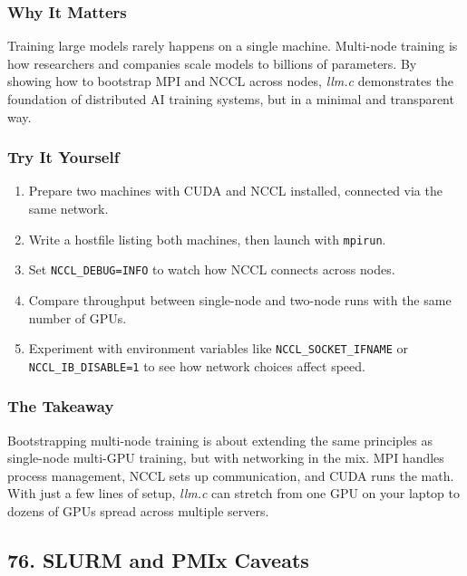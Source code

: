 \documentclass[
  letterpaper,
  DIV=11,
  numbers=noendperiod]{scrreprt}
\providecommand{\tightlist}{%
  \setlength{\itemsep}{0pt}\setlength{\parskip}{0pt}}
\begin{document}
\subsubsection{Why It Matters}\label{why-it-matters-49}

Training large models rarely happens on a single machine. Multi-node
training is how researchers and companies scale models to billions of
parameters. By showing how to bootstrap MPI and NCCL across nodes,
\emph{llm.c} demonstrates the foundation of distributed AI training
systems, but in a minimal and transparent way.

\subsubsection{Try It Yourself}\label{try-it-yourself-63}

\begin{enumerate}
\def\labelenumi{\arabic{enumi}.}
\tightlist
\item
  Prepare two machines with CUDA and NCCL installed, connected via the
  same network.
\item
  Write a hostfile listing both machines, then launch with
  \texttt{mpirun}.
\item
  Set \texttt{NCCL\_DEBUG=INFO} to watch how NCCL connects across nodes.
\item
  Compare throughput between single-node and two-node runs with the same
  number of GPUs.
\item
  Experiment with environment variables like
  \texttt{NCCL\_SOCKET\_IFNAME} or \texttt{NCCL\_IB\_DISABLE=1} to see
  how network choices affect speed.
\end{enumerate}

\subsubsection{The Takeaway}\label{the-takeaway-64}

Bootstrapping multi-node training is about extending the same principles
as single-node multi-GPU training, but with networking in the mix. MPI
handles process management, NCCL sets up communication, and CUDA runs
the math. With just a few lines of setup, \emph{llm.c} can stretch from
one GPU on your laptop to dozens of GPUs spread across multiple servers.

\subsection{76. SLURM and PMIx Caveats}\label{slurm-and-pmix-caveats}
\end{document}
